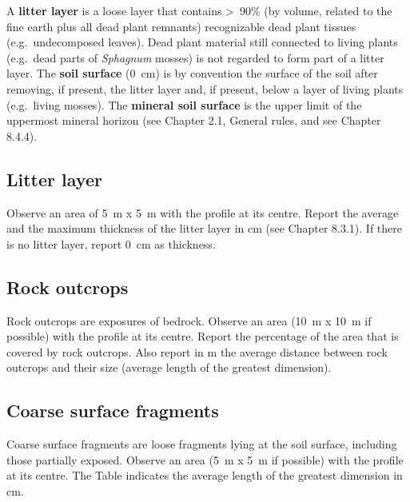 \documentclass[
  letterpaper,
  DIV=11,
  numbers=noendperiod]{scrreprt}
\begin{document}
A \textbf{litter layer} is a loose layer that contains \textgreater~90\%
(by volume, related to the fine earth plus all dead plant remnants)
recognizable dead plant tissues (e.g.~undecomposed leaves). Dead plant
material still connected to living plants (e.g.~dead parts of
\emph{Sphagnum} mosses) is not regarded to form part of a litter layer.
The \textbf{soil surface} (0~cm) is by convention the surface of the
soil after removing, if present, the litter layer and, if present, below
a layer of living plants (e.g.~living mosses). The \textbf{mineral soil
surface} is the upper limit of the uppermost mineral horizon (see
Chapter 2.1, General rules, and see Chapter 8.4.4).

\hypertarget{litter-layer}{%
\subsection{Litter layer}\label{litter-layer}}

Observe an area of 5~m x 5~m with the profile at its centre. Report the
average and the maximum thickness of the litter layer in cm (see Chapter
8.3.1). If there is no litter layer, report 0~cm as thickness.

\hypertarget{rock-outcrops}{%
\subsection{Rock outcrops}\label{rock-outcrops}}

Rock outcrops are exposures of bedrock. Observe an area (10~m x 10~m if
possible) with the profile at its centre. Report the percentage of the
area that is covered by rock outcrops. Also report in m the average
distance between rock outcrops and their size (average length of the
greatest dimension).

\hypertarget{coarse-surface-fragments}{%
\subsection{Coarse surface fragments}\label{coarse-surface-fragments}}

Coarse surface fragments are loose fragments lying at the soil surface,
including those partially exposed. Observe an area (5~m x 5~m if
possible) with the profile at its centre. The Table indicates the
average length of the greatest dimension in cm.
\end{document}
